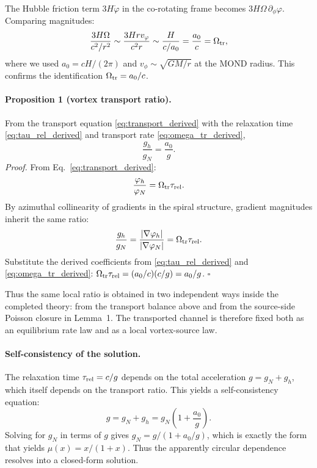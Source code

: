\documentclass[11pt]{article}
\begin{document}
The Hubble friction term $3H\dot{\varphi}$ in the co-rotating frame becomes $3H\Omega\,\partial_\phi\varphi$. Comparing magnitudes:
\begin{equation}
\frac{3H\Omega}{c^2/r^2} \sim \frac{3Hrv_\phi}{c^2r} \sim \frac{H}{c/a_0} = \frac{a_0}{c} = \Omega_{\rm tr},
\label{eq:magnitude_compare}
\end{equation}
where we used $a_0 = cH/(2\pi)$ and $v_\phi \sim \sqrt{GM/r}$ at the MOND radius. This confirms the identification $\Omega_{\rm tr} = a_0/c$.

\paragraph{Proposition 1 (vortex transport ratio).}
From the transport equation \eqref{eq:transport_derived} with the relaxation time \eqref{eq:tau_rel_derived} and transport rate \eqref{eq:omega_tr_derived},
\begin{equation}
\frac{g_h}{g_N}=\frac{a_0}{g}.
\label{eq:hysteresis_ratio}
\end{equation}
\textit{Proof.}
From Eq.~\eqref{eq:transport_derived}:
\begin{equation}
\frac{\varphi_h}{\varphi_N}=\Omega_{\rm tr}\tau_{\rm rel}.
\label{eq:phi_ratio}
\end{equation}
By azimuthal collinearity of gradients in the spiral structure, gradient magnitudes inherit the same ratio:
\begin{equation}
\frac{g_h}{g_N}
=\frac{|\nabla\varphi_h|}{|\nabla\varphi_N|}
=\Omega_{\rm tr}\tau_{\rm rel}.
\label{eq:g_ratio}
\end{equation}
Substitute the derived coefficients from \eqref{eq:tau_rel_derived} and \eqref{eq:omega_tr_derived}:
$\Omega_{\rm tr}\tau_{\rm rel}=(a_0/c)(c/g)=a_0/g$.
\hfill$\square$

Thus the same local ratio is obtained in two independent ways inside the
completed theory: from the transport balance above and from the source-side
Poisson closure in Lemma~1.  The transported channel is therefore fixed both as
an equilibrium rate law and as a local vortex-source law.

\paragraph{Self-consistency of the solution.}
The relaxation time $\tau_{\rm rel}=c/g$ depends on the total acceleration $g=g_N+g_h$, which itself depends on the transport ratio. This yields a self-consistency equation:
\begin{equation}
g = g_N + g_h = g_N\left(1 + \frac{a_0}{g}\right).
\label{eq:self_consistency}
\end{equation}
Solving for $g_N$ in terms of $g$ gives $g_N = g/(1+a_0/g)$, which is exactly the form that yields $\mu(x)=x/(1+x)$. Thus the apparently circular dependence resolves into a closed-form solution.
\end{document}
